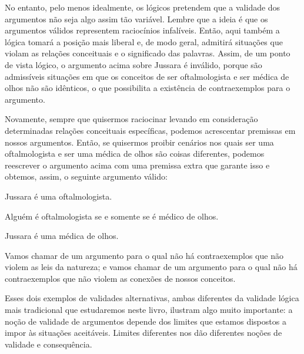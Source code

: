 No entanto, pelo menos idealmente, os lógicos pretendem que a validade dos argumentos não seja algo assim tão variável.
Lembre que a ideia é que os argumentos válidos representem raciocínios infalíveis.
Então, aqui também a lógica tomará a posição mais liberal e, de modo geral, admitirá situações que violam as relações conceituais e o significado das palavras.
Assim, de um ponto de vista lógico, o argumento acima sobre Jussara é inválido, porque são admissíveis situações em que os conceitos de ser oftalmologista e ser médica de olhos não são idênticos, o que possibilita a existência de contraexemplos para o argumento.

Novamente, sempre que quisermos raciocinar levando em consideração determinadas relações conceituais específicas, podemos acrescentar premissas em nossos argumentos.
Então, se quisermos proibir cenários nos quais ser uma oftalmologista e ser uma médica de olhos são coisas diferentes, podemos reescrever o argumento acima com uma premissa extra que garante isso e obtemos, assim, o seguinte argumento válido:

	\begin{earg}
		\item[] Jussara é uma oftalmologista.
		\item[] Alguém é oftalmologista se e somente se é médico de olhos.
		\item[\therefore] Jussara é uma médica de olhos.
	\end{earg}

Vamos chamar de \label{nomoval} um argumento para o qual não há contraexemplos que não violem as leis da natureza; e vamos chamar de  um argumento para o qual não há contraexemplos que não violem as conexões de nossos conceitos.

Esses dois exemplos de validades alternativas, ambas diferentes da validade lógica mais tradicional que estudaremos neste livro, ilustram algo muito importante:
a noção de validade de argumentos depende dos limites que estamos dispostos a impor às situações aceitáveis.
Limites diferentes nos dão diferentes noções de validade e consequência.



